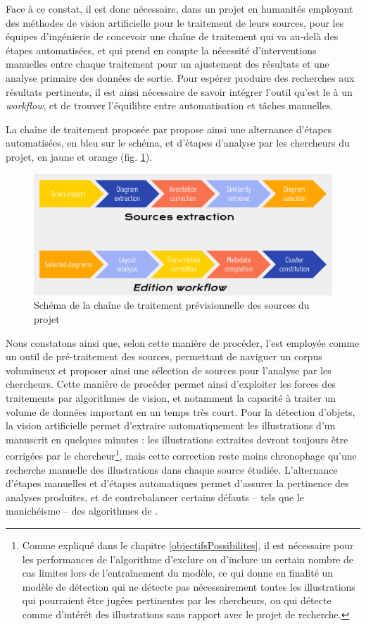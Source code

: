     Face à ce constat, il est donc nécessaire, dans un projet en humanités employant des méthodes de vision artificielle pour le traitement de leurs sources, pour les équipes d'ingénierie de concevoir une chaîne de traitement qui va au-delà des étapes automatisées, et qui prend en compte la nécessité d'interventions manuelles entre chaque traitement pour un ajustement des résultats et une analyse primaire des données de sortie. Pour espérer produire des recherches aux résultats pertinents, il est ainsi nécessaire de savoir intégrer l'outil qu'est le \dl à un \textit{workflow}, et de trouver l'équilibre entre automatisation et tâches manuelles.
	
	La chaîne de traitement proposée par \eida propose ainsi une alternance d'étapes automatisées, en bleu sur le schéma, et d'étapes d'analyse par les chercheurs du projet, en jaune et orange (fig. \ref{fig:eida_workflow}).
    
    \begin{figure}[h]
    	\centering
    	\includegraphics[width=16cm]{images/eida_workflow.png}
    	\caption{Schéma de la chaîne de traitement prévisionnelle des sources du projet \eida}
    	\label{fig:eida_workflow}
    \end{figure}

	Nous constatons ainsi que, selon cette manière de procéder, l'\ia est employée comme un outil de pré-traitement des sources, permettant de naviguer un corpus volumineux et proposer ainsi une sélection de sources pour l'analyse par les chercheurs. Cette manière de procéder permet ainsi d'exploiter les forces des traitements par algorithmes de vision, et notamment la capacité à traiter un volume de données important en un temps très court. Pour la détection d'objets, la vision artificielle permet d'extraire automatiquement les illustrations d'un manuscrit en quelques minutes : les illustrations extraites devront toujours être corrigées par le chercheur\footnote{Comme expliqué dans le chapitre \ref{objectifsPossibilites}, il est nécessaire pour les performances de l'algorithme d'exclure ou d'inclure un certain nombre de cas limites lors de l'entraînement du modèle, ce qui donne en finalité un modèle de détection qui ne détecte pas nécessairement toutes les illustrations qui pourraient être jugées pertinentes par les chercheurs, ou qui détecte comme d'intérêt des illustrations sans rapport avec le projet de recherche.}, mais cette correction reste moins chronophage qu'une recherche manuelle des illustrations dans chaque source étudiée. L'alternance d'étapes manuelles et d'étapes automatiques permet d'assurer la pertinence des analyses produites, et de contrebalancer certains défauts -- tels que le manichéisme -- des algorithmes de \cv.
	
